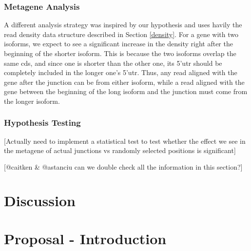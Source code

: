 \documentclass[12pt]{article}
\begin{document}
\subsubsection{Metagene Analysis}
A different analysis strategy was inspired by our hypothesis and uses havily the read density data structure described in Section \ref{density}. For a gene with two isoforms, we expect to see a significant increase in the density right after the beginning of the shorter isoform. This is because the two isoforms overlap the same \acrshort{cds}, and since one is shorter than the other one, its 5'\acrshort{utr} should be completely included in the longer one's 5'\acrshort{utr}. Thus, any read aligned with the gene after the junction can be from either isoform, while a read aligned with the gene between the beginning of the long isoform and the junction must come from the longer isoform. 


\subsubsection{Hypothesis Testing}

[Actually need to implement a statistical test to test whether the effect we see in the metagene of actual junctions vs randomly selected positions is significant]






[@caitken \& @astanciu can we double check all the information in this section?]


\section{Discussion}\label{disc}

\section{Proposal - Introduction}
\end{document}
